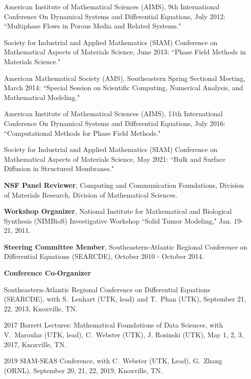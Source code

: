\documentclass[11pt]{letter}
\begin{document}
\begin{description}
\begin{description}
\begin{description}
	\item
American Institute of Mathematical Sciences (AIMS), 9th International Conference On Dynamical Systems and Differential Equations, July 2012: ``Multiphase Flows in Porous Media and Related Systems."
    \item
Society for Industrial and Applied Mathematics (SIAM) Conference on Mathematical Aspects of Materials Science, June 2013: ``Phase Field Methods in Materials Science."
	\item
American Mathematical Society (AMS), Southeastern Spring Sectional Meeting, March 2014: ``Special Session on Scientific Computing, Numerical Analysis, and Mathematical Modeling."
	\item
American Institute of Mathematical Sciences (AIMS), 11th International Conference On Dynamical Systems and Differential Equations, July 2016: ``Computational Methods for Phase Field Methods."
    \item
Society for Industrial and Applied Mathematics (SIAM) Conference on Mathematical Aspects of Materials Science, May 2021: ``Bulk and Surface Diffusion in Structured Membranes."
	\end{description}
	\item
\textbf{NSF Panel Reviewer}, Computing and Communication Foundations, Division of Materials Research, Division of Mathematical Sciences.
	\item
\textbf{Workshop Organizer}, National Institute for Mathematical and Biological Synthesis (NIMBioS) Investigative Workshop ``Solid Tumor Modeling," Jan. 19-21, 2011.
	\item
\textbf{Steering Committee Member}, Southeastern-Atlantic Regional Conference on Differential Equations (SEARCDE), October 2010 - October 2014.
	\item
\textbf{Conference Co-Organizer} 
	\begin{description}
	\item 
Southeastern-Atlantic Regional Conference on Differential Equations (SEARCDE), with S.~Lenhart (UTK, lead) and T.~Phan (UTK), September 21, 22, 2013, Knoxville, TN.
	\item
2017 Barrett Lectures: Mathematical Foundations of Data Sciences, with V.~Maroulas (UTK, lead), C.~Webster (UTK), J. Rosinski (UTK), May 1, 2, 3, 2017, Knoxville, TN.
	\item
2019 SIAM-SEAS Conference, with C.~Webster (UTK, Lead), G.~Zhang (ORNL), September 20, 21, 22, 2019, Knoxville, TN.
	\end{description}
    \end{description}
    \end{description}
    
\end{document}
